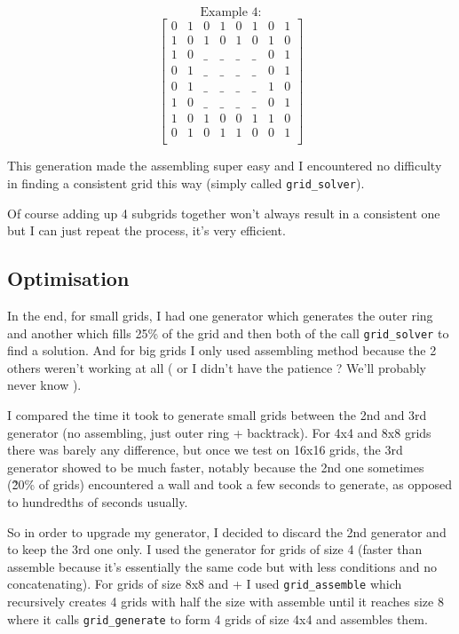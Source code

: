 \documentclass{article}
\begin{document}
\[
\text{Example 4:}
\]
\[
\begin{bmatrix}
  0 & 1 & 0 & 1 & 0 & 1 & 0 & 1 \\
  1 & 0 & 1 & 0 & 1 & 0 & 1 & 0 \\
  1 & 0 & \_ & \_ & \_ & \_ & 0 & 1 \\
  0 & 1 & \_ & \_ & \_ & \_ & 0 & 1 \\
  0 & 1 & \_ & \_ & \_ & \_ & 1 & 0 \\
  1 & 0 & \_ & \_ & \_ & \_ & 0 & 1 \\
  1 & 0 & 1 & 0 & 0 & 1 & 1 & 0 \\
  0 & 1 & 0 & 1 & 1 & 0 & 0 & 1 \\
\end{bmatrix}
\]

\vspace{1em}

This generation made the assembling super easy and I encountered no difficulty in finding a consistent grid this way (simply called \texttt{grid\_solver}).

Of course adding up 4 subgrids together won't always result in a consistent one but I can just repeat the process, it's very efficient.

\subsection{Optimisation}

In the end, for small grids, I had one generator which generates the outer ring and another which fills 25\% of the grid and then both of the call \texttt{grid\_solver} to find a solution. And for big grids I only used assembling method because the 2 others weren't working at all ( or I didn't have the patience ? We'll probably never know ).

I compared the time it took to generate small grids between the 2nd and 3rd generator (no assembling, just outer ring + backtrack). For 4x4 and 8x8 grids there was barely any difference, but once we test on 16x16 grids, the 3rd generator showed to be much faster, notably because the 2nd one sometimes (\~20\% of grids) encountered a wall and took a few seconds to generate, as opposed to hundredths of seconds usually.
\vspace{1em}

So in order to upgrade my generator, I decided to discard the 2nd generator and to keep the 3rd one only. I used the generator for grids of size 4 (faster than assemble because it's essentially the same code but with less conditions and no concatenating). For grids of size 8x8 and + I used \texttt{grid\_assemble} which recursively creates 4 grids with half the size with assemble until it reaches size 8 where it calls \texttt{grid\_generate} to form 4 grids of size 4x4 and assembles them.
\vspace{1em}
\end{document}
